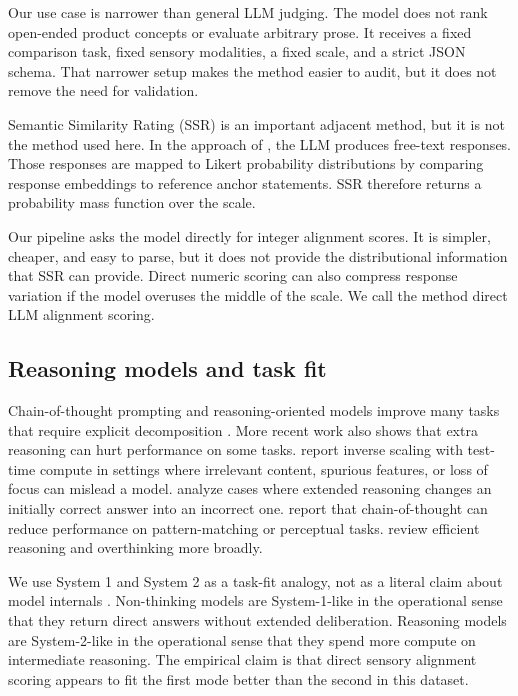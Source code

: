 \documentclass[12pt]{article}
\begin{document}
Our use case is narrower than general LLM judging. The model does not rank open-ended product concepts or evaluate arbitrary prose. It receives a fixed comparison task, fixed sensory modalities, a fixed scale, and a strict JSON schema. That narrower setup makes the method easier to audit, but it does not remove the need for validation.

Semantic Similarity Rating (SSR) is an important adjacent method, but it is not the method used here. In the approach of \citet{maier2025ssr}, the LLM produces free-text responses. Those responses are mapped to Likert probability distributions by comparing response embeddings to reference anchor statements. SSR therefore returns a probability mass function over the scale.

Our pipeline asks the model directly for integer alignment scores. It is simpler, cheaper, and easy to parse, but it does not provide the distributional information that SSR can provide. Direct numeric scoring can also compress response variation if the model overuses the middle of the scale. We call the method direct LLM alignment scoring.

\subsection{Reasoning models and task fit}

Chain-of-thought prompting and reasoning-oriented models improve many tasks that require explicit decomposition \citep{wei2022cot}. More recent work also shows that extra reasoning can hurt performance on some tasks. \citet{gema2025inverse} report inverse scaling with test-time compute in settings where irrelevant content, spurious features, or loss of focus can mislead a model. \citet{zhou2026reasoning} analyze cases where extended reasoning changes an initially correct answer into an incorrect one. \citet{liu2024cotperceptual} report that chain-of-thought can reduce performance on pattern-matching or perceptual tasks. \citet{sui2025overthinking} review efficient reasoning and overthinking more broadly.

We use System 1 and System 2 as a task-fit analogy, not as a literal claim about model internals \citep{kahneman2011thinking}. Non-thinking models are System-1-like in the operational sense that they return direct answers without extended deliberation. Reasoning models are System-2-like in the operational sense that they spend more compute on intermediate reasoning. The empirical claim is that direct sensory alignment scoring appears to fit the first mode better than the second in this dataset.
\end{document}
